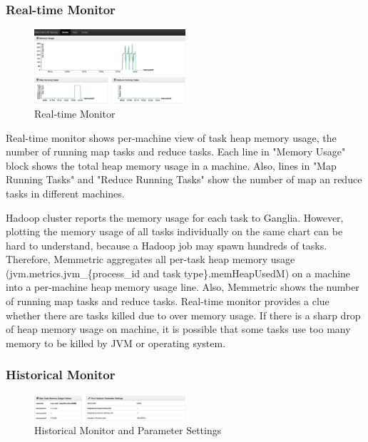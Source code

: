 \subsubsection{Real-time Monitor}

\begin{figure}[h!]
  \caption{Real-time Monitor}
  \centering
    \includegraphics[width=0.5\textwidth]{image/real-time-monitor.png}
\end{figure}

Real-time monitor shows per-machine view of task heap memory usage, the number of running map tasks and reduce tasks. Each line in "Memory Usage" block shows the total heap memory usage in a machine. Also, lines in "Map Running Tasks" and "Reduce Running Tasks" show the number of map an reduce tasks in different machines.

Hadoop cluster reports the memory usage for each task to Ganglia. However, plotting the memory usage of all tasks individually on the same chart can be hard to understand, because a Hadoop job may spawn hundreds of tasks. Therefore, Memmetric aggregates all per-task heap memory usage (jvm.metrics.jvm\_\{process\_id and task type\}.memHeapUsedM) on a machine into a per-machine heap memory usage line. Also, Memmetric shows the number of running map tasks and reduce tasks. Real-time monitor provides a clue whether there are tasks killed due to over memory usage. If there is a sharp drop of heap memory usage on machine, it is possible that some tasks use too many memory to be killed by JVM or operating system. 

\subsubsection{Historical Monitor}

\begin{figure}[h!]
  \caption{Historical Monitor and Parameter Settings}
  \centering
    \includegraphics[width=0.5\textwidth]{image/historical-monitor.png}
\end{figure}

